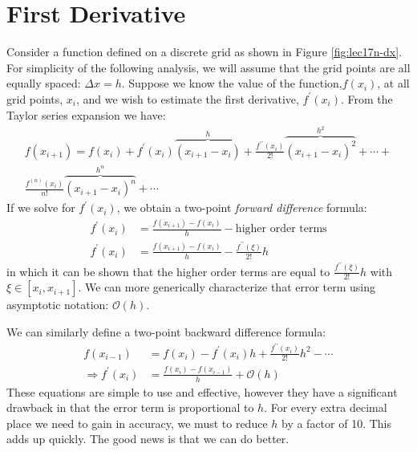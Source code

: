 \section{First Derivative}
Consider a function defined on a discrete grid as shown in Figure \ref{fig:lec17n-dx}.  For simplicity of the following analysis, we will assume that the grid points are all equally spaced: $\Delta x = h$.  Suppose we know the value of the function,$f(x_i)$, at all grid points, $x_i$, and we wish to estimate the first derivative, $f^{\prime}(x_i)$.  From the Taylor series expansion we have:
\begin{multline*}
f(x_{i+1}) = f(x_i) + f^{\prime}(x_i)\overbrace{(x_{i+1}-x_i)}^{h} + \frac{f^{\prime \prime}(x_i)}{2!}\overbrace{(x_{i+1} - x_i)^2}^{h^2} + \cdots + \\ \frac{f^{(n)}(x_i)}{n!}\overbrace{(x_{i+1}-x_i)^n}^{h^n} + \cdots
\end{multline*}
If we solve for $f^{\prime}(x_i)$, we obtain a two-point \emph{forward difference} formula:
\begin{align*}
f^{\prime}(x_i) &= \frac{f(x_{i+1}) - f(x_i)}{h} - \text{higher order terms} \\
f^{\prime}(x_i) &= \frac{f(x_{i+1}) - f(x_i)}{h} - \frac{f^{\prime \prime}(\xi)}{2!}h
\end{align*}
in which it can be shown that the higher order terms are equal to $\frac{f^{\prime \prime}(\xi)}{2!}h$ with $\xi \in [x_{i},x_{i+1}]$.  We can more generically characterize that error term using asymptotic notation: $\mathcal{O}(h)$.

We can similarly define a two-point backward difference formula:
\begin{align*}
f(x_{i-1}) &= f(x_i) - f^{\prime}(x_i)h + \frac{f^{\prime \prime}(x_i)}{2!}h^2 - \cdots \\
\Rightarrow f^{\prime}(x_{i}) &= \frac{f(x_i) - f(x_{i-1})}{h} + \mathcal{O}(h)
\end{align*}
These equations are simple to use and effective, however they have a significant drawback in that the error term is proportional to $h$.  For every extra decimal place we need to gain in accuracy, we must to reduce $h$ by a factor of 10.  This adds up quickly.  The good news is that we can do better.  

